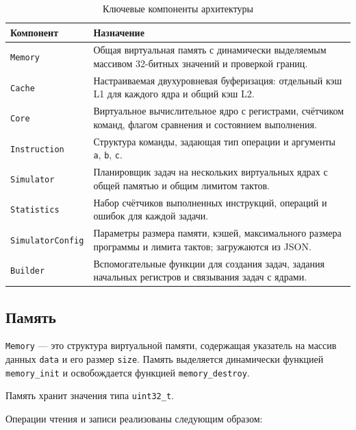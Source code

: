 \documentclass[12pt,a4paper]{article}
\begin{document}
\begin{table}[H]
    \centering
    \caption{Ключевые компоненты архитектуры}
    \label{tab:components}
    \begin{tabular}{|p{4cm}|p{8cm}|}
        \hline
        \textbf{Компонент} & \textbf{Назначение} \\
        \hline
        \texttt{Memory} & Общая виртуальная память с динамически выделяемым массивом 32-битных значений и проверкой границ. \\
        \hline
        \texttt{Cache} & Настраиваемая двухуровневая буферизация: отдельный кэш L1 для каждого ядра и общий кэш L2. \\
        \hline
        \texttt{Core} & Виртуальное вычислительное ядро с регистрами, счётчиком команд, флагом сравнения и состоянием выполнения. \\
        \hline
        \texttt{Instruction} & Структура команды, задающая тип операции и аргументы \texttt{a}, \texttt{b}, \texttt{c}. \\
        \hline
        \texttt{Simulator} & Планировщик задач на нескольких виртуальных ядрах с общей памятью и общим лимитом тактов. \\
        \hline
        \texttt{Statistics} & Набор счётчиков выполненных инструкций, операций и ошибок для каждой задачи. \\
        \hline
        \texttt{SimulatorConfig} & Параметры размера памяти, кэшей, максимального размера программы и лимита тактов; загружаются из JSON. \\
        \hline
        \texttt{Builder} & Вспомогательные функции для создания задач, задания начальных регистров и связывания задач с ядрами. \\
        \hline
    \end{tabular}
\end{table}

\subsection{Память}

\texttt{Memory} --- это структура виртуальной памяти, содержащая указатель на массив данных \texttt{data} и его размер \texttt{size}. Память выделяется динамически функцией \texttt{memory\_init} и освобождается функцией \texttt{memory\_destroy}.

Память хранит значения типа \texttt{uint32\_t}.

Операции чтения и записи реализованы следующим образом:
\end{document}

